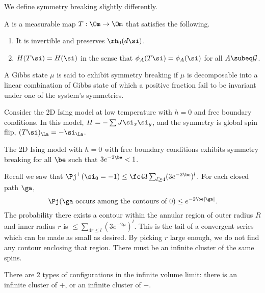

We define symmetry breaking slightly differently.

\begin{df}
A  is a measurable map $T:\Om\to \Om$ that satisfies the following.
\begin{enumerate}
\item
It is invertible and preserves $\rh_0(d\si)$.
\item
$H(T\si) = H(\si)$ in the sense that $\phi_A(T\si) = \phi_A(\si)$ for all $A\subeq \cal G$.
\end{enumerate}
\end{df}

\begin{df}
A Gibbs state $\mu$ is said to exhibit symmetry breaking if $\mu$ is decomposable into a linear combination of Gibbs state of which a positive fraction fail to be invariant under one of the system's symmetries.
\end{df}

Consider the 2D Ising model at low temperature with $h=0$ and free boundary conditions. In this model, $H=-\sum J\si_x\si_y$, and the symmetry is global spin flip, $(T\si)_\La = -\si_\La$.

\begin{thm}
The 2D Ising model with $h=0$ with free boundary conditions exhibits symmetry breaking for all $\be$ such that $3e^{-2\be}<1$.
\end{thm}

Recall we saw that $\Pj^+(\si_0=-1) \le \fc 43 \sum_{l\ge 4}(3e^{-2\be})^l$.
For each closed path $\ga$,
\[
\Pj(\ga \text{ occurs among the contours of }0) \le e^{-2\be|\ga|}.
\]
The probability there exists a contour within the annular region of outer radius $R$ and inner radius $r$ is $\le \sum_{4r\le l}(3e^{-2\mu})^l$. This is the tail of a convergent series which can be made as small as desired. By picking $r$ large enough, we do not find any contour enclosing that region.
There must be an infinite cluster of the same spins.

There are 2 types of configurations in the infinite volume limit: there is an infinite cluster of $+$, or an infinite cluster of $-$.

